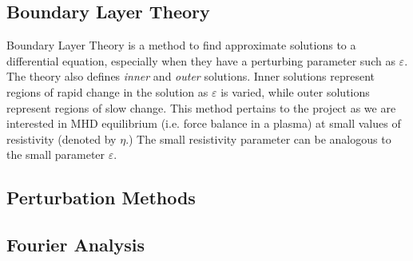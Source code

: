 \documentclass[../main.tex]{subfiles}
\begin{document}

\subsection{Boundary Layer Theory}

Boundary Layer Theory is a method to find approximate solutions to a differential equation, especially when they have a perturbing parameter such as $\varepsilon$. The theory also defines 
\textit{inner} and \textit{outer} solutions. Inner solutions represent regions of rapid change in the solution as $\varepsilon$ is varied, while outer solutions represent regions of slow change. This method pertains to the project as we are interested in MHD equilibrium (i.e. force balance in a plasma) at small values of resistivity (denoted by $\eta$.) The small resistivity parameter can be analogous to the small parameter $\varepsilon.$

\subsection{Perturbation Methods}

\subsection{Fourier Analysis}
\end{document}
